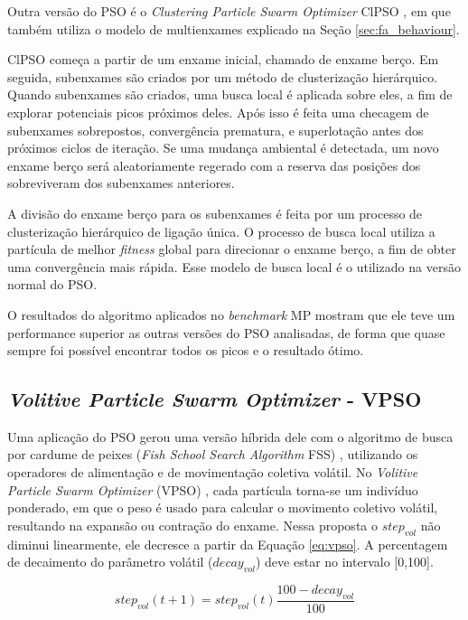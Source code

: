 Outra versão do PSO é o \textit{Clustering Particle Swarm Optimizer} ClPSO \cite{yang2010clustering}, em que também utiliza o modelo de multienxames explicado na Seção \ref{sec:fa_behaviour}.

ClPSO começa a partir de um enxame inicial, chamado de enxame berço. Em seguida, subenxames são criados por um método de clusterização hierárquico. Quando subenxames são criados, uma busca local é aplicada sobre eles, a fim de explorar potenciais picos próximos deles. Após isso é feita uma checagem de subenxames sobrepostos, convergência prematura, e superlotação antes dos próximos ciclos de iteração. Se uma mudança ambiental é detectada, um novo enxame berço será aleatoriamente regerado com a reserva das posições dos sobreviveram dos subenxames anteriores.

A divisão do enxame berço para os subenxames é feita por um processo de clusterização hierárquico de ligação única. O processo de busca local utiliza a partícula de melhor \textit{fitness} global para direcionar o enxame berço, a fim de obter uma convergência mais rápida. Esse modelo de busca local é o utilizado na versão normal do PSO. 

O resultados do algoritmo aplicados no \textit{benchmark} MP mostram que ele teve um performance superior as outras versões do PSO analisadas, de forma que quase sempre foi possível encontrar todos os picos e o resultado ótimo.

\subsection{\textit{Volitive Particle Swarm Optimizer} - VPSO}
\label{sec:vpso}

Uma aplicação do PSO gerou uma versão híbrida dele com o algoritmo de busca por cardume de peixes (\textit{Fish School Search Algorithm} FSS) \cite{carmelo2008novel}, utilizando os operadores de alimentação e de movimentação coletiva volátil. No \textit{Volitive Particle Swarm Optimizer} (VPSO) \cite{cavalcanti2011hybrid}, cada partícula torna-se um indivíduo ponderado, em que o peso é usado para calcular o movimento coletivo volátil, resultando na expansão ou contração do enxame. Nessa proposta o $step_{vol}$ não diminui linearmente, ele decresce a partir da Equação \ref{eq:vpso}. A percentagem de decaimento do parâmetro volátil ($decay_{vol}$) deve estar no intervalo [0,100].

\begin{equation}
\label{eq:vpso}
step_{vol}(t+1) = step_{vol}(t) \frac{100 - decay_{vol}}{100}
\end{equation}

